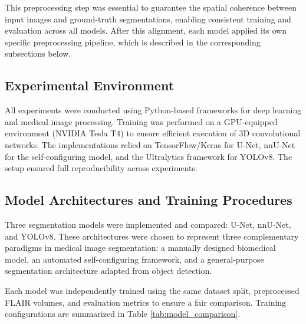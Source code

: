 \documentclass[12pt]{article}
\begin{document}
This preprocessing step was essential to guarantee the spatial coherence between input images and ground-truth segmentations, enabling consistent training and evaluation across all models. After this alignment, each model applied its own specific preprocessing pipeline, which is described in the corresponding subsections below.

\subsection{Experimental Environment} \label{subsec:environment}

All experiments were conducted using Python-based frameworks for deep learning and medical image processing. Training was performed on a GPU-equipped environment (NVIDIA Tesla T4) to ensure efficient execution of 3D convolutional networks. The implementations relied on TensorFlow/Keras for U-Net, nnU-Net for the self-configuring model, and the Ultralytics framework for YOLOv8. The setup ensured full reproducibility across experiments.

\subsection{Model Architectures and Training Procedures} \label{subsec:models}

Three segmentation models were implemented and compared: U-Net, nnU-Net, and YOLOv8. These architectures were chosen to represent three complementary paradigms in medical image segmentation: a manually designed biomedical model, an automated self-configuring framework, and a general-purpose segmentation architecture adapted from object detection.

Each model was independently trained using the same dataset split, preprocessed FLAIR volumes, and evaluation metrics to ensure a fair comparison. Training configurations are summarized in Table \ref{tab:model_comparison}.
\end{document}
